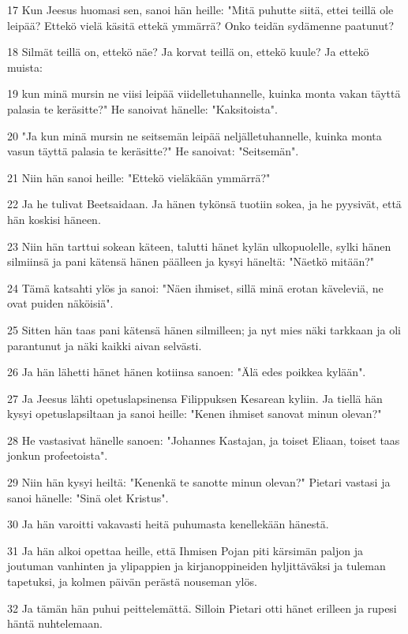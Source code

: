 \par 17 Kun Jeesus huomasi sen, sanoi hän heille: "Mitä puhutte siitä, ettei teillä ole leipää? Ettekö vielä käsitä ettekä ymmärrä? Onko teidän sydämenne paatunut?
\par 18 Silmät teillä on, ettekö näe? Ja korvat teillä on, ettekö kuule? Ja ettekö muista:
\par 19 kun minä mursin ne viisi leipää viidelletuhannelle, kuinka monta vakan täyttä palasia te keräsitte?" He sanoivat hänelle: "Kaksitoista".
\par 20 "Ja kun minä mursin ne seitsemän leipää neljälletuhannelle, kuinka monta vasun täyttä palasia te keräsitte?" He sanoivat: "Seitsemän".
\par 21 Niin hän sanoi heille: "Ettekö vieläkään ymmärrä?"
\par 22 Ja he tulivat Beetsaidaan. Ja hänen tykönsä tuotiin sokea, ja he pyysivät, että hän koskisi häneen.
\par 23 Niin hän tarttui sokean käteen, talutti hänet kylän ulkopuolelle, sylki hänen silmiinsä ja pani kätensä hänen päälleen ja kysyi häneltä: "Näetkö mitään?"
\par 24 Tämä katsahti ylös ja sanoi: "Näen ihmiset, sillä minä erotan käveleviä, ne ovat puiden näköisiä".
\par 25 Sitten hän taas pani kätensä hänen silmilleen; ja nyt mies näki tarkkaan ja oli parantunut ja näki kaikki aivan selvästi.
\par 26 Ja hän lähetti hänet hänen kotiinsa sanoen: "Älä edes poikkea kylään".
\par 27 Ja Jeesus lähti opetuslapsinensa Filippuksen Kesarean kyliin. Ja tiellä hän kysyi opetuslapsiltaan ja sanoi heille: "Kenen ihmiset sanovat minun olevan?"
\par 28 He vastasivat hänelle sanoen: "Johannes Kastajan, ja toiset Eliaan, toiset taas jonkun profeetoista".
\par 29 Niin hän kysyi heiltä: "Kenenkä te sanotte minun olevan?" Pietari vastasi ja sanoi hänelle: "Sinä olet Kristus".
\par 30 Ja hän varoitti vakavasti heitä puhumasta kenellekään hänestä.
\par 31 Ja hän alkoi opettaa heille, että Ihmisen Pojan piti kärsimän paljon ja joutuman vanhinten ja ylipappien ja kirjanoppineiden hyljittäväksi ja tuleman tapetuksi, ja kolmen päivän perästä nouseman ylös.
\par 32 Ja tämän hän puhui peittelemättä. Silloin Pietari otti hänet erilleen ja rupesi häntä nuhtelemaan.
